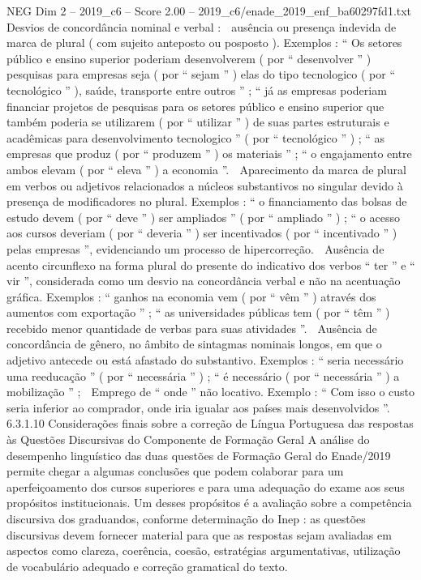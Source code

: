 \begin{textsample}{NEG Dim 2 – 2019\_c6 – Score 2.00 – 2019\_c6/enade\_2019\_enf\_ba60297fd1.txt}
Desvios de concordância nominal e verbal :  ausência ou presença indevida de marca de plural ( com sujeito anteposto ou posposto ).
Exemplos : “ Os setores público e ensino superior poderiam desenvolverem ( por “ desenvolver ” ) pesquisas para empresas seja ( por “ sejam ” ) elas do tipo tecnologico ( por “ tecnológico ” ), saúde, transporte entre outros ” ; “ já as empresas poderiam financiar projetos de pesquisas para os setores público e ensino superior que também poderia se utilizarem ( por “ utilizar ” ) de suas partes estruturais e acadêmicas para desenvolvimento tecnologico ” ( por “ tecnológico ” ) ; “ as empresas que produz ( por “ produzem ” ) os materiais ” ; “ o engajamento entre ambos elevam ( por “ eleva ” ) a economia ”.  Aparecimento da marca de plural em verbos ou adjetivos relacionados a núcleos substantivos no singular devido à presença de modificadores no plural.
Exemplos : “ o financiamento das bolsas de estudo devem ( por “ deve ” ) ser ampliados ” ( por “ ampliado ” ) ; “ o acesso aos cursos deveriam ( por “ deveria ” ) ser incentivados ( por “ incentivado ” ) pelas empresas ”, evidenciando um processo de hipercorreção.  Ausência de acento circunflexo na forma plural do presente do indicativo dos verbos “ ter ” e “ vir ”, considerada como um desvio na concordância verbal e não na acentuação gráfica.
Exemplos : “ ganhos na economia vem ( por “ vêm ” ) através dos aumentos com exportação ” ; “ as universidades públicas tem ( por “ têm ” ) recebido menor quantidade de verbas para suas atividades ”.  Ausência de concordância de gênero, no âmbito de sintagmas nominais longos, em que o adjetivo antecede ou está afastado do substantivo.
Exemplos : “ seria necessário uma reeducação ” ( por “ necessária ” ) ; “ é necessário ( por “ necessária ” ) a mobilização ” ;  Emprego de “ onde ” não locativo.
Exemplo : “ Com isso o custo seria inferior ao comprador, onde iria igualar aos países mais desenvolvidos ”. 6.3.1.10 Considerações finais sobre a correção de Língua Portuguesa das respostas às Questões Discursivas do Componente de Formação Geral A análise do desempenho linguístico das duas questões de Formação Geral do Enade/2019 permite chegar a algumas conclusões que podem colaborar para um aperfeiçoamento dos cursos superiores e para uma adequação do exame aos seus propósitos institucionais.
Um desses propósitos é a avaliação sobre a competência discursiva dos graduandos, conforme determinação do Inep : as questões discursivas devem fornecer material para que as respostas sejam avaliadas em aspectos como clareza, coerência, coesão, estratégias argumentativas, utilização de vocabulário adequado e correção gramatical do texto.

\end{textsample}
